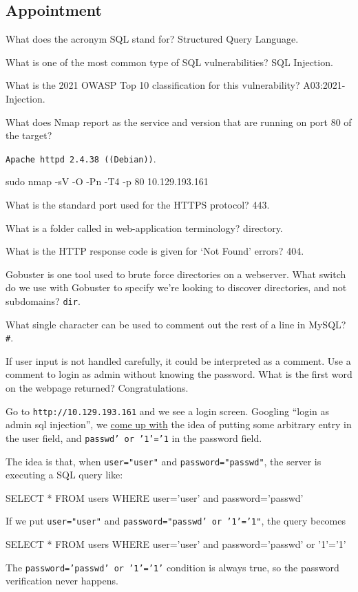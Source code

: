 \documentclass[a4paper,10pt]{article}
\begin{document}
\subsection{Appointment \faLinux}

What does the acronym SQL stand for? Structured Query Language.

What is one of the most common type of SQL vulnerabilities? SQL Injection.

What is the 2021 OWASP Top 10 classification for this vulnerability? A03:2021-Injection.

What does Nmap report as the service and version that are running on port 80 of the target?

\texttt{Apache httpd 2.4.38 ((Debian))}.
\begin{bash}
sudo nmap -sV -O -Pn -T4 -p 80 10.129.193.161
\end{bash}

What is the standard port used for the HTTPS protocol? 443.

What is a folder called in web-application terminology? directory.

What is the HTTP response code is given for `Not Found' errors? 404.

Gobuster is one tool used to brute force directories on a webserver. What switch do we use with Gobuster to specify we're looking to discover directories, and not subdomains? \texttt{dir}.

What single character can be used to comment out the rest of a line in MySQL? \texttt{#}.

If user input is not handled carefully, it could be interpreted as a comment. Use a comment to login as admin without knowing the password. What is the first word on the webpage returned? Congratulations.

\n

Go to \texttt{http://10.129.193.161} and we see a login screen. Googling ``login as admin sql injection'', we \href{https://sechow.com/bricks/docs/login-1.html}{come up with} the idea of putting some arbitrary entry in the user field, and \texttt{passwd' or '1'='1} in the password field.

The idea is that, when \texttt{user="user"} and \texttt{password="passwd"}, the server is executing a SQL query like:
\begin{sql}
SELECT * FROM users WHERE user='user' and password='passwd'
\end{sql}
If we put \texttt{user="user"} and \texttt{password="passwd' or '1'='1"}, the query becomes
\begin{sql}
SELECT * FROM users WHERE user='user' and password='passwd' or '1'='1'
\end{sql}
The \texttt{password='passwd' or '1'='1'} condition is always true, so the password verification never happens.
\end{document}
